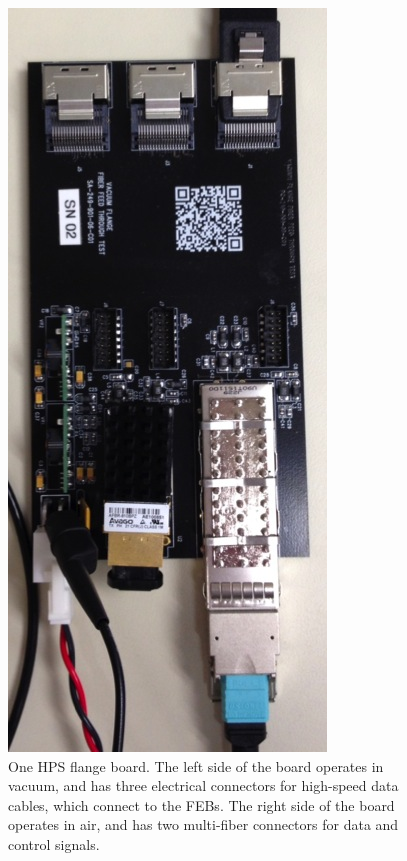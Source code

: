 \begin{figure}[ht]
    \includegraphics[angle=90,width=\textwidth]{detector/figs/flangeboard}
    \caption{One HPS flange board. The left side of the board operates in vacuum, and has three electrical connectors for high-speed data cables, which connect to the FEBs. The right side of the board operates in air, and has two multi-fiber connectors for data and control signals.}
    \label{figure:svt_layout}
\end{figure}

